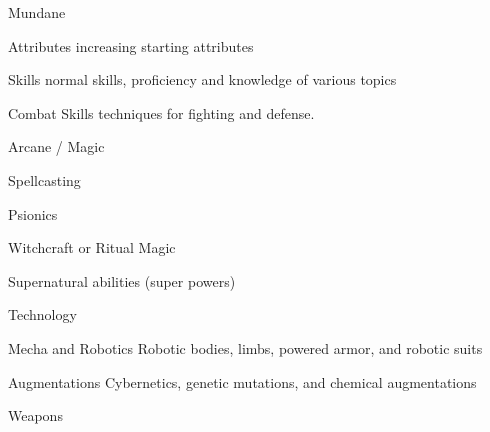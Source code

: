 \documentclass[twoside]{book}
\begin{document}
                 Mundane 
                    
                      
                       Attributes   
                        increasing starting attributes   
                      
                      
                       Skills   
                          normal skills, proficiency and knowledge
                         of various topics 
                      
                      
                       Combat Skills   
                          techniques for fighting and defense.
                         
                      
                    
                  
                
                
                 Arcane / Magic 
                  
                    
                       Spellcasting 
                      
                    
                    
                       Psionics 
                      
                    
                    
                       Witchcraft or Ritual Magic
                       
                      
                    
                    
                       Supernatural abilities (super powers)
                       
                      
                    
                  
                  
                
                
                 Technology 
                  
                    
                       Mecha and Robotics 
                       Robotic bodies, limbs, powered armor, and
                       robotic suits 
                    
                    
                       Augmentations 
                       Cybernetics, genetic mutations, and chemical
                       augmentations 
                    
                    
                       Weapons 
                      
                    
                    
\end{document}

